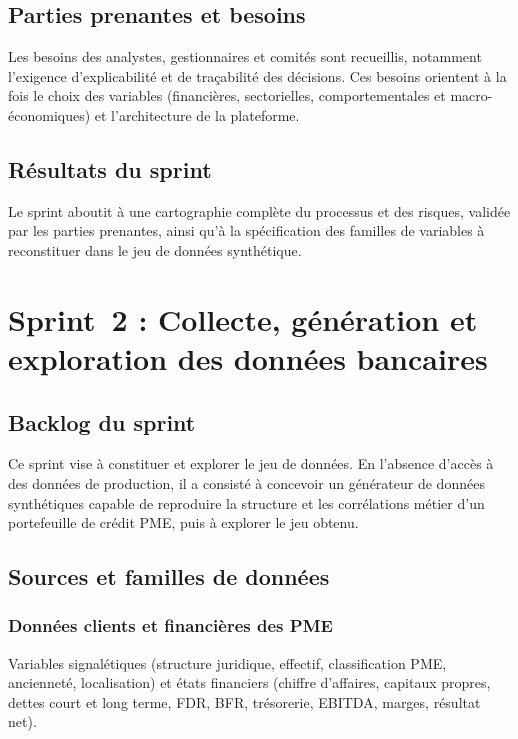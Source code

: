 \documentclass[a4paper,12pt,oneside]{report}
\begin{document}
\subsection{Parties prenantes et besoins}

Les besoins des analystes, gestionnaires et comités sont recueillis, notamment l'exigence
d'explicabilité et de traçabilité des décisions. Ces besoins orientent à la fois le choix des
variables (financières, sectorielles, comportementales et macro-économiques) et l'architecture
de la plateforme.

\subsection{Résultats du sprint}

Le sprint aboutit à une cartographie complète du processus et des risques, validée par les
parties prenantes, ainsi qu'à la spécification des familles de variables à reconstituer dans
le jeu de données synthétique.

\section{Sprint~2 : Collecte, génération et exploration des données bancaires}

\subsection{Backlog du sprint}

Ce sprint vise à constituer et explorer le jeu de données. En l'absence d'accès à des données
de production, il a consisté à concevoir un générateur de données synthétiques capable
de reproduire la structure et les corrélations métier d'un portefeuille de crédit PME, puis à
explorer le jeu obtenu.

\subsection{Sources et familles de données}

\subsubsection{Données clients et financières des PME}

Variables signalétiques (structure juridique, effectif, classification PME, ancienneté,
localisation) et états financiers (chiffre d'affaires, capitaux propres, dettes court et long
terme, FDR, BFR, trésorerie, EBITDA, marges, résultat net).
\end{document}
